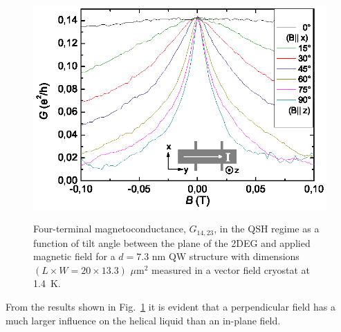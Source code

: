 \documentclass{article}
\begin{document}
\begin{figure}[hbt]
\centering
 \includegraphics[width=0.8\linewidth]{80608Fig15.eps}\\
 \caption{Four-terminal magnetoconductance, $G_{14,23}$,
 in the QSH regime as a function of tilt angle between
 the plane of the 2DEG and applied magnetic field for a
 $d = 7.3$ nm QW structure with dimensions
 $(L\times W = 20 \times 13.3)$ $\mu$m$^2$
 measured in a vector field cryostat at 1.4~K.}
 \label{FigQSHBanis}
\end{figure}
From the results shown in Fig.~\ref{FigQSHBanis} it is evident that
a perpendicular field has a much larger influence on the helical
liquid than an in-plane field.
\end{document}
